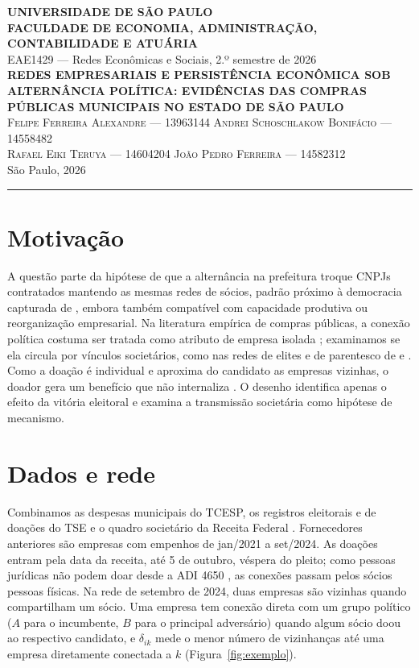 \documentclass[11pt,a4paper]{article}
\newcounter{quadro}
\begin{document}
\begin{center}
{\bfseries\MakeUppercase{Universidade de São Paulo}}\\
{\bfseries\MakeUppercase{Faculdade de Economia, Administração, Contabilidade e Atuária}}\\[0.5ex]
{\small EAE1429 --- Redes Econômicas e Sociais, 2.º semestre de 2026}\\[1.4ex]
{\large\bfseries\MakeUppercase{Redes empresariais e persistência econômica sob alternância política: evidências das compras públicas municipais no estado de São Paulo}}\\[1.4ex]
{\small\scshape Felipe Ferreira Alexandre --- 13963144 \quad Andrei Schoschlakow Bonifácio --- 14558482\\
Rafael Eiki Teruya --- 14604204 \quad João Pedro Ferreira --- 14582312}\\[0.4ex]
{\small São Paulo, 2026}\par
\avisoAmostra
\end{center}
\vspace{-0.6ex}\hrule\vspace{1.2ex}

\section{Motivação}
\achadoPrincipal{} A questão parte da hipótese de que a alternância na prefeitura troque CNPJs
contratados mantendo as mesmas redes de sócios, padrão próximo à democracia capturada de
, embora também compatível com capacidade produtiva ou reorganização
empresarial. Na literatura empírica de compras públicas, a conexão política costuma ser tratada
como atributo de empresa isolada \cite{boas2014,baltrunaite2020}; examinamos se ela circula por
vínculos societários, como nas redes de elites e de parentesco de  e
. Como a doação é individual e aproxima do candidato as empresas vizinhas,
o doador gera um benefício que não internaliza \cite{jackson1996}. O desenho identifica apenas
o efeito da vitória eleitoral e examina a transmissão societária como hipótese de mecanismo.

\section{Dados e rede}
\label{sec:dados}
Combinamos as despesas municipais do TCESP, os registros eleitorais e de doações do TSE e o
quadro societário da Receita Federal \cite{tcesp2026,tse2026,rfb2026}. Fornecedores anteriores
são empresas com empenhos de jan/2021 a set/2024. As doações entram pela data da receita, até
5 de outubro, véspera do pleito; como pessoas jurídicas não podem doar desde a ADI 4650
\cite{adi4650}, as conexões passam pelos sócios pessoas físicas. Na rede de setembro de 2024,
duas empresas são vizinhas quando compartilham um sócio. Uma empresa tem conexão direta com um
grupo político ($A$ para o incumbente, $B$ para o principal adversário) quando algum sócio
doou ao respectivo candidato, e $\delta_{ik}$ mede o menor número de vizinhanças até uma
empresa diretamente conectada a $k$ (Figura~\ref{fig:exemplo}).
\end{document}
